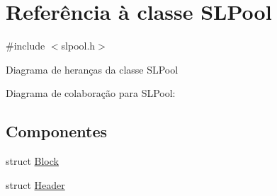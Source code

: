 \hypertarget{classSLPool}{}\section{Referência à classe S\+L\+Pool}
\label{classSLPool}


{\ttfamily \#include $<$slpool.\+h$>$}



Diagrama de heranças da classe S\+L\+Pool


Diagrama de colaboração para S\+L\+Pool\+:
\subsection*{Componentes}
\begin{DoxyCompactItemize}
\item 
struct \hyperlink{structSLPool_1_1Block}{Block}
\item 
struct \hyperlink{structSLPool_1_1Header}{Header}
\end{DoxyCompactItemize}
